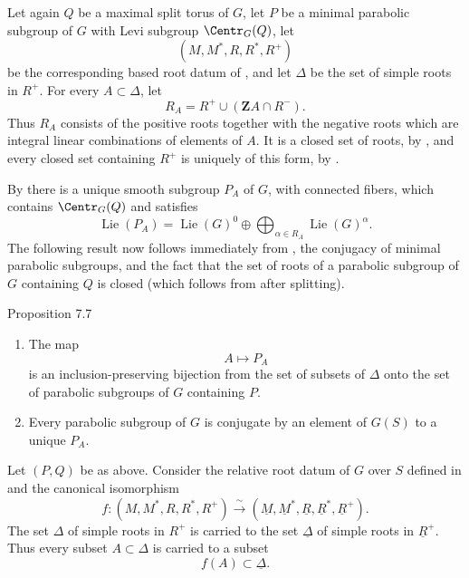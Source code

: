 Let again \(Q\) be a maximal split torus of \(G\), let \(P\) be a
minimal parabolic subgroup of \(G\) with Levi subgroup
\(\Centr_G(Q)\), let
\[
 (M,M^*,R,R^*,R^+)
\]
be the corresponding based root datum of , and let \(\Delta\)
be the set of simple roots in \(R^+\).  For every
\(A\subset\Delta\), let
\[
 R_A=R^+\cup(\mathbf Z A\cap R^-).
\]
Thus \(R_A\) consists of the positive roots together with the
negative roots which are integral linear combinations of elements
of \(A\).  It is a closed set of roots, by , and
every closed set containing \(R^+\) is uniquely of this form, by
.

By  there is a unique smooth subgroup \(P_A\) of \(G\), with
connected fibers, which contains \(\Centr_G(Q)\) and satisfies
\[
 \operatorname{Lie}(P_A)
 =\operatorname{Lie}(G)^0
  \oplus\bigoplus_{\alpha\in R_A}\operatorname{Lie}(G)^\alpha.
\]
The following result now follows immediately from , the
conjugacy of minimal parabolic subgroups, and the fact that the set
of roots of a parabolic subgroup of \(G\) containing \(Q\) is
closed \textup{(which follows from  after splitting)}.

\begin{sgastatement}{Proposition 7.7}
\begin{enumerate}[label=\textup{(\roman*)}]
\item The map
\[
 A\longmapsto P_A
\]
is an inclusion-preserving bijection from the set of subsets of
\(\Delta\) onto the set of parabolic subgroups of \(G\) containing
\(P\).
\item Every parabolic subgroup of \(G\) is conjugate by an element
of \(G(S)\) to a unique \(P_A\).
\end{enumerate}
\end{sgastatement}


Let \((P,Q)\) be as above.  Consider the relative root datum of
\(G\) over \(S\) defined in  and the canonical isomorphism
\[
 f:(M,M^*,R,R^*,R^+)
   \xrightarrow{\ \sim\ }
   (\underline M,\underline M^*,\underline R,
    \underline R^*,\underline R^+).
\]
The set \(\Delta\) of simple roots in \(R^+\) is carried to the set
\(\underline\Delta\) of simple roots in \(\underline R^+\).
Thus every subset \(A\subset\Delta\) is carried to a subset
\[
 f(A)\subset\underline\Delta.
\]

